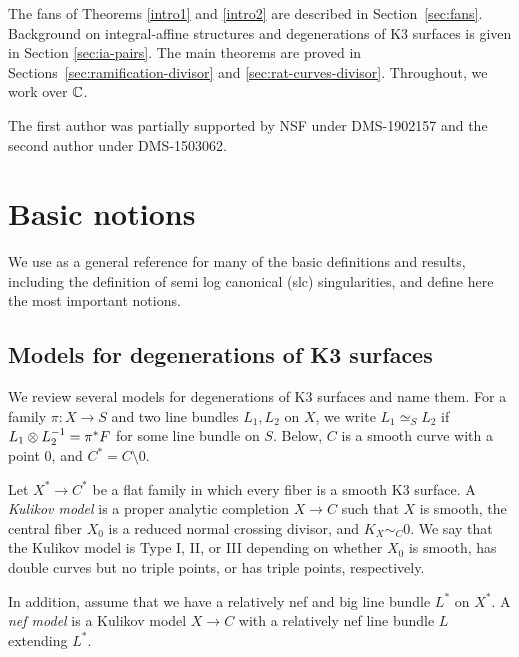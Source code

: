 \documentclass[table,x11names]{amsart}
\begin{document}
The fans of Theorems \ref{intro1} and \ref{intro2} are described in
Section~\ref{sec:fans}. Background on integral-affine structures and
degenerations of K3 surfaces is given in Section \ref{sec:ia-pairs}.
The main theorems are proved in
Sections~\ref{sec:ramification-divisor} and
\ref{sec:rat-curves-divisor}. 
Throughout, we work over ${\mathbb C}$.

\begin{acknowledgements}
  The first author was partially supported by NSF under DMS-1902157
  and the second author under DMS-1503062.
\end{acknowledgements}


\section{Basic notions}
\label{sec:basics}

We use \cite{alexeev2019stable-pair} as a general reference for many
of the basic definitions and results, including the definition of semi
log canonical (slc) singularities, and define here the most important notions.

\subsection{Models for degenerations of K3 surfaces}
\label{sec:models}

We review several models for degenerations of K3 surfaces and name
them.  For a family $\pi\colon X\to S$ and two line
bundles $L_1,L_2$ on $X$, we write $L_1\simeq_S L_2$ if $L_1\otimes
L_2^{-1} = \pi^* F$ for some line bundle on $S$.
Below, $C$ is a smooth curve with a point $0$, and $C^*=C\setminus 0$.

\begin{definition}\label{def:kulikov}
  Let $X^*\to C^*$ be a flat family in which every fiber is a
  smooth K3 surface. A \emph{Kulikov model} is a proper analytic completion
  $X\to C$ such that $X$ is smooth, the central fiber
  $X_0$ is a reduced normal crossing divisor, and $K_{X}\sim_C 0$. 
  We say that the Kulikov model is Type I, II, or III depending on whether
  $X_0$ is smooth, has double curves but no triple points, or
  has triple points, respectively. 
\end{definition}

\begin{definition}
  In addition, assume that we have a relatively nef and big line
  bundle $L^*$ on $X^*$. A \emph{nef model} is a Kulikov model
  $X\to C$ with a relatively nef line bundle $L$ extending
  $L^*$.
\end{definition}
\end{document}
